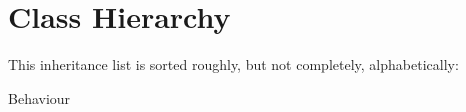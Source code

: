 \section{Class Hierarchy}
This inheritance list is sorted roughly, but not completely, alphabetically\+:\begin{DoxyCompactList}
\item Behaviour\begin{DoxyCompactList}
\item {}
\item {}
\end{DoxyCompactList}
\end{DoxyCompactList}
